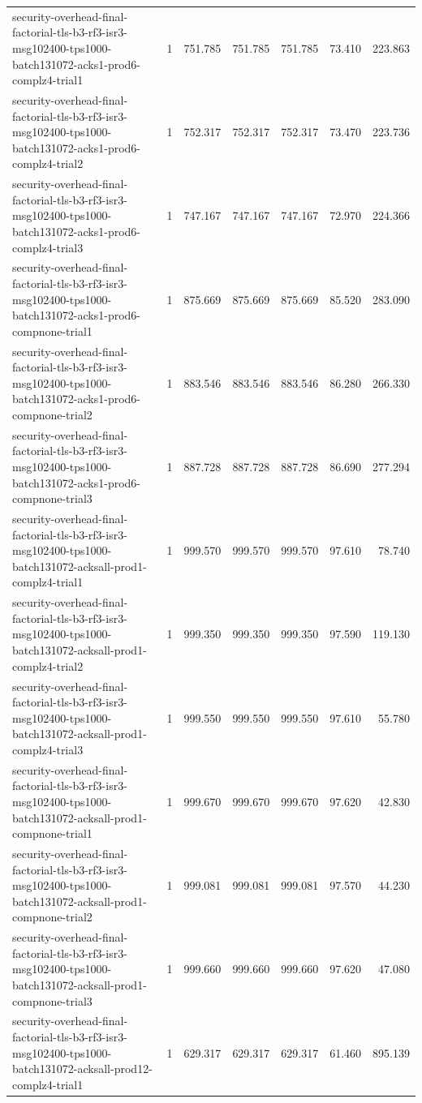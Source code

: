 \begin{tabular}{lrrrrrr}
security-overhead-final-factorial-tls-b3-rf3-isr3-msg102400-tps1000-batch131072-acks1-prod6-complz4-trial1 & 1 & 751.785 & 751.785 & 751.785 & 73.410 & 223.863 \\
security-overhead-final-factorial-tls-b3-rf3-isr3-msg102400-tps1000-batch131072-acks1-prod6-complz4-trial2 & 1 & 752.317 & 752.317 & 752.317 & 73.470 & 223.736 \\
security-overhead-final-factorial-tls-b3-rf3-isr3-msg102400-tps1000-batch131072-acks1-prod6-complz4-trial3 & 1 & 747.167 & 747.167 & 747.167 & 72.970 & 224.366 \\
security-overhead-final-factorial-tls-b3-rf3-isr3-msg102400-tps1000-batch131072-acks1-prod6-compnone-trial1 & 1 & 875.669 & 875.669 & 875.669 & 85.520 & 283.090 \\
security-overhead-final-factorial-tls-b3-rf3-isr3-msg102400-tps1000-batch131072-acks1-prod6-compnone-trial2 & 1 & 883.546 & 883.546 & 883.546 & 86.280 & 266.330 \\
security-overhead-final-factorial-tls-b3-rf3-isr3-msg102400-tps1000-batch131072-acks1-prod6-compnone-trial3 & 1 & 887.728 & 887.728 & 887.728 & 86.690 & 277.294 \\
security-overhead-final-factorial-tls-b3-rf3-isr3-msg102400-tps1000-batch131072-acksall-prod1-complz4-trial1 & 1 & 999.570 & 999.570 & 999.570 & 97.610 & 78.740 \\
security-overhead-final-factorial-tls-b3-rf3-isr3-msg102400-tps1000-batch131072-acksall-prod1-complz4-trial2 & 1 & 999.350 & 999.350 & 999.350 & 97.590 & 119.130 \\
security-overhead-final-factorial-tls-b3-rf3-isr3-msg102400-tps1000-batch131072-acksall-prod1-complz4-trial3 & 1 & 999.550 & 999.550 & 999.550 & 97.610 & 55.780 \\
security-overhead-final-factorial-tls-b3-rf3-isr3-msg102400-tps1000-batch131072-acksall-prod1-compnone-trial1 & 1 & 999.670 & 999.670 & 999.670 & 97.620 & 42.830 \\
security-overhead-final-factorial-tls-b3-rf3-isr3-msg102400-tps1000-batch131072-acksall-prod1-compnone-trial2 & 1 & 999.081 & 999.081 & 999.081 & 97.570 & 44.230 \\
security-overhead-final-factorial-tls-b3-rf3-isr3-msg102400-tps1000-batch131072-acksall-prod1-compnone-trial3 & 1 & 999.660 & 999.660 & 999.660 & 97.620 & 47.080 \\
security-overhead-final-factorial-tls-b3-rf3-isr3-msg102400-tps1000-batch131072-acksall-prod12-complz4-trial1 & 1 & 629.317 & 629.317 & 629.317 & 61.460 & 895.139 \\

\end{tabular}
